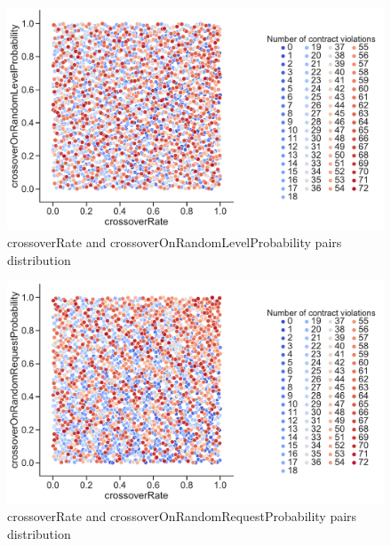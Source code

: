 \begin{figure}
	\centering
	\includegraphics[width=\textwidth]{images/PairsDistr/crossoverRate_crossoverOnRandomLevelProbability.pdf}
	\caption[crossoverRate and crossoverOnRandomLevelProbability pairs distribution]{crossoverRate and crossoverOnRandomLevelProbability pairs distribution}
	\label{fig:crossoverRate_crossoverOnRandomLevelProbability_pair}
\end{figure}
\begin{figure}
	\centering
	\includegraphics[width=\textwidth]{images/PairsDistr/crossoverRate_crossoverOnRandomRequestProbability.pdf}
	\caption[crossoverRate and crossoverOnRandomRequestProbability pairs distribution]{crossoverRate and crossoverOnRandomRequestProbability pairs distribution}
	\label{fig:crossoverRate_crossoverOnRandomRequestProbability_pair}
\end{figure}
